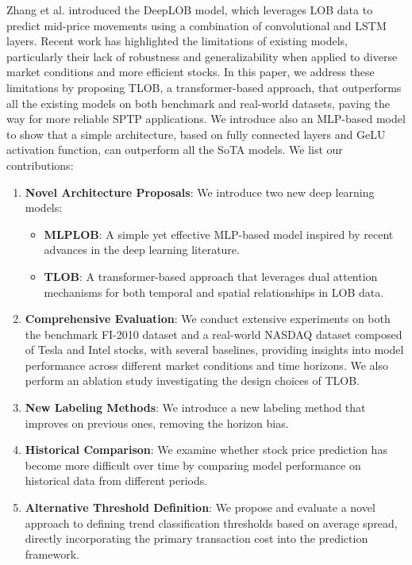 Zhang et al. \cite{zhang2019deeplob} introduced the DeepLOB model, which leverages LOB data to predict mid-price movements using a combination of convolutional and LSTM layers.
Recent work \cite{prata2024lob} has highlighted the limitations of existing models, particularly their lack of robustness and generalizability when applied to diverse market conditions and more efficient stocks.
In this paper, we address these limitations by proposing TLOB, a transformer-based approach, that outperforms all the existing models on both benchmark and real-world datasets, paving the way for more reliable SPTP applications. We introduce also an MLP-based model to show that a simple architecture, based on fully connected layers and GeLU activation function, can outperform all the SoTA models.
We list our contributions:
\begin{enumerate}
    \item \textbf{Novel Architecture Proposals}: We introduce two new deep learning models:
    \begin{itemize}
        \item \textbf{MLPLOB}: A simple yet effective MLP-based model inspired by recent advances in the deep learning literature.
        \item \textbf{TLOB}: A transformer-based approach that leverages dual attention mechanisms for both temporal and spatial relationships in LOB data.
    \end{itemize}
    \item \textbf{Comprehensive Evaluation}: We conduct extensive experiments on both the benchmark FI-2010 dataset and a real-world NASDAQ dataset composed of Tesla and Intel stocks, with several baselines, providing insights into model performance across different market conditions and time horizons. We also perform an ablation study investigating the design choices of TLOB. 
    \item \textbf{New Labeling Methods}: We introduce a new labeling method that improves on previous ones, removing the horizon bias.
    \item \textbf{Historical Comparison}: We examine whether stock price prediction has become more difficult over time by comparing model performance on historical data from different periods. 
    \item \textbf{Alternative Threshold Definition}: We propose and evaluate a novel approach to defining trend classification thresholds based on average spread, directly incorporating the primary transaction cost into the prediction framework. 

\end{enumerate}


    